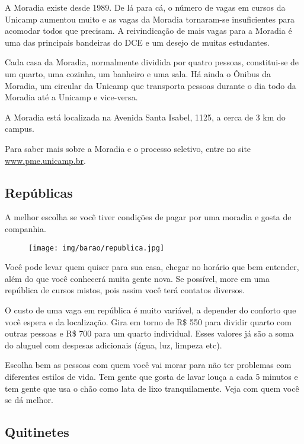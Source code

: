A Moradia existe desde 1989. De lá para cá, o número de vagas em cursos da
Unicamp aumentou muito e as vagas da Moradia tornaram-se insuficientes para
acomodar todos que precisam. A reivindicação de mais vagas para a Moradia é uma
das principais bandeiras do DCE e um desejo de muitas estudantes.

Cada casa da Moradia, normalmente dividida por quatro pessoas, constitui-se de
um quarto, uma cozinha, um banheiro e uma sala. Há ainda o Ônibus da Moradia,
um circular da Unicamp que transporta pessoas durante o dia todo da Moradia até
a Unicamp e vice-versa.

A Moradia está localizada na Avenida Santa Isabel, 1125, a cerca de 3 km do
campus.

Para saber mais sobre a Moradia e o processo seletivo, entre no site
\url{www.pme.unicamp.br}.

\subsection{Repúblicas}

A melhor escolha se você tiver condições de pagar por uma moradia e gosta de
companhia.

\begin{figure}[h!]
    \centering
    \texttt{[image: img/barao/republica.jpg]}
\end{figure}

Você pode levar quem quiser para sua casa, chegar no horário que bem entender,
além do que você conhecerá muita gente nova. Se possível, more em uma república
de cursos mistos, pois assim você terá contatos diversos.

O custo de uma vaga em república é muito variável, a depender do conforto que
você espera e da localização. Gira em torno de R\$ 550 para dividir quarto com
outras pessoas e R\$ 700 para um quarto individual. Esses valores já são a soma
do aluguel com despesas adicionais (água, luz, limpeza etc).

Escolha bem as pessoas com quem você vai morar para não ter problemas com
diferentes estilos de vida. Tem gente que gosta de lavar louça a cada 5 minutos
e tem gente que usa o chão como lata de lixo tranquilamente. Veja com quem você
se dá melhor.

\subsection{Quitinetes}

